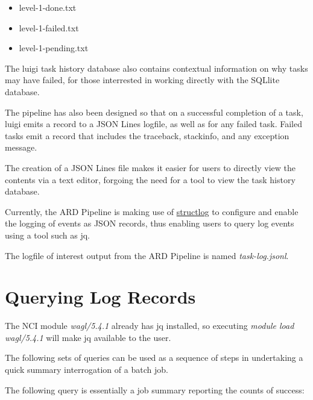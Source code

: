 \documentclass[a4paper,oneside,titlepage]{article}
\begin{document}
    \begin{itemize}
      \item level-1-done.txt
      \item level-1-failed.txt
      \item level-1-pending.txt
    \end{itemize}

    \begin{flushleft}
      The luigi task history database also contains contextual information on why tasks may have failed, for those interrested in working directly with the SQLlite database. \par
      The pipeline has also been designed so that on a successful completion of a task, luigi emits a record to a JSON Lines logfile, as well as for any failed task. Failed tasks emit a record that includes the traceback, stackinfo, and any exception message. \par
      The creation of a JSON Lines file makes it easier for users to directly view the contents via a text editor, forgoing the need for a tool to view the task history database. \par
      Currently, the ARD Pipeline is making use of \href{https://www.structlog.org/en/stable/}{structlog} to configure and enable the logging of events as JSON records, thus enabling users to query log events using a tool such as jq. \par
      The logfile of interest output from the ARD Pipeline is named \textit{task-log.jsonl}.
    \end{flushleft}

  \section{Querying Log Records}

    \begin{flushleft}
      The NCI module \textit{wagl/5.4.1} already has jq installed, so executing \textit{module load wagl/5.4.1} will make jq available to the user. \par
      The following sets of queries can be used as a sequence of steps in undertaking a quick summary interrogation of a batch job.
    \end{flushleft}

    \begin{flushleft}
      The following query is essentially a job summary reporting the counts of success:
    \end{flushleft}
\end{document}
